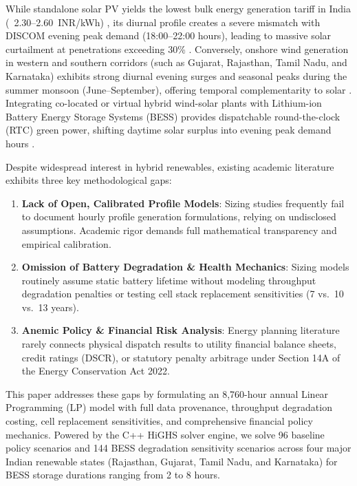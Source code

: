 \documentclass[11pt,a4paper]{article}
\begin{document}
While standalone solar PV yields the lowest bulk energy generation tariff in India (~2.30--2.60~INR/kWh) \cite{IRENA2021, Gupta2024}, its diurnal profile creates a severe mismatch with DISCOM evening peak demand (18:00--22:00 hours), leading to massive solar curtailment at penetrations exceeding 30\% \cite{TERI2020}. Conversely, onshore wind generation in western and southern corridors (such as Gujarat, Rajasthan, Tamil Nadu, and Karnataka) exhibits strong diurnal evening surges and seasonal peaks during the summer monsoon (June--September), offering temporal complementarity to solar \cite{Singh2024}. Integrating co-located or virtual hybrid wind-solar plants with Lithium-ion Battery Energy Storage Systems (BESS) provides dispatchable round-the-clock (RTC) green power, shifting daytime solar surplus into evening peak demand hours \cite{Gulia2021, IEEFA2021}.

Despite widespread interest in hybrid renewables, existing academic literature exhibits three key methodological gaps:
\begin{enumerate}
    \item \textbf{Lack of Open, Calibrated Profile Models}: Sizing studies frequently fail to document hourly profile generation formulations, relying on undisclosed assumptions. Academic rigor demands full mathematical transparency and empirical calibration.
    \item \textbf{Omission of Battery Degradation \& Health Mechanics}: Sizing models routinely assume static battery lifetime without modeling throughput degradation penalties or testing cell stack replacement sensitivities (7 vs.\ 10 vs.\ 13 years).
    \item \textbf{Anemic Policy \& Financial Risk Analysis}: Energy planning literature rarely connects physical dispatch results to utility financial balance sheets, credit ratings (DSCR), or statutory penalty arbitrage under Section 14A of the Energy Conservation Act 2022.
\end{enumerate}

This paper addresses these gaps by formulating an 8,760-hour annual Linear Programming (LP) model with full data provenance, throughput degradation costing, cell replacement sensitivities, and comprehensive financial policy mechanics. Powered by the C++ HiGHS solver engine, we solve 96 baseline policy scenarios and 144 BESS degradation sensitivity scenarios across four major Indian renewable states (Rajasthan, Gujarat, Tamil Nadu, and Karnataka) for BESS storage durations ranging from 2 to 8 hours.
\end{document}
